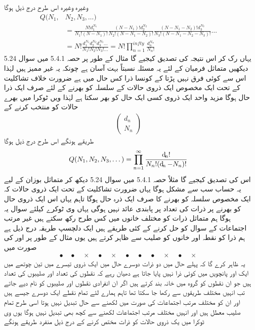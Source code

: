 وغیرہ وغیرہ اس طرح درج ذیل ہوگا 
\begin{align}
Q (N_1 , &N_2 , N_3 , \dotsc) \\
&= \frac{N ! d_1^{N_1}}{N_1 ! (N - N_1) !} \frac{(N - N_1) ! d_2^{N_2}}{N_2 ! (N - N_1 - N_2) !} \frac{(N - N_1 - N_2) ! d_3^{N_3}}{N_3 ! (N - N_1 - N_2 - N_3) !} \dotsc\\
&= N ! \frac{d_1^{N_1} d_2^{N_2} d_3^{N_3} \dotsc}{N_1 ! N_2 ! N_3 ! \dotsc} = N! \prod_{n = 1}^{infty} \frac{d_n^{N_n}}{N_n !}
\end{align}
یہاں رک کر اس نتیجہ کی تصدیق کیجیے گا مثال کے طور پر حصہ 5.4.1 میں سوال 5.24 دیکھیں متماثل فرمیان کے لئے یہ مسئلہ نسبتاً بہت آسان ہے چونکہ یہ غیر ممیز ہیں لہٰذا اس سے کوئی فرق نہیں پڑتا کے کونسا ذرا کس حال میں ہے ضرورت خلاف تشاکلیت کے تحت ایک مخصوص ایک ذروی حالات کے سلسلہ کو بھرنے کے لئے صرف ایک  ذرا حال ہوگا مزید واحد ایک ذروی کسی ایک حال کو بھر سکتا ہے لہٰذا  ویں ٹوکرا میں  بهرے  حالات کو منتخب کرنے کے 
\begin{align*}
\begin{pmatrix}
d_n \\
N_n
\end{pmatrix}
\end{align*}
طریقے ہونگے اس طرح درج ذیل ہوگا 
\begin{align}
Q (N_1 , N_2 , N_3 , \dotsc ) = \prod_{n = 1}^{\infty} \frac{\dif_n !}{N_n ! (\dif_n - N_n) !}
\end{align}
اس کی تصدیق کیجیے گا مثلاً حصہ 5.4.1 میں سوال 5.24 دیکھ کر متماثل بوزان کے لیے یہ حساب سب سے مشکل ہوگا یہاں ضرورت تشاکلیت کے تحت ایک ذروی حالات کہ ایک مخصوص سلسلہ کو بھرنے کا صرف ایک  ذرہ حال ہوگا تاہم یہاں اس ایک ذروی حال کو بھرنے پر ذرات کی تعداد پر پابندی عائد نہیں ہوگی یہاں  وی ٹوکرے کیلئے سوال یہ ہوگا ہم متماثل  ذرات کو  مختلف خانوں میں کس طرح رکھ سکتے ہیں غیر مرتب اجتماعات کے سوال کو حل کرنے کے کئی طریقے ہیں ایک دلچسپ طریقہ درج ذیل ہے ہم ذرا کو نقطہ اور خانوں کو صلیب سے ظاہر کرتے ہیں یوں مثال کے طور پر  اور  کی صورت میں
\begin{align*} 
\bullet \quad \bullet \quad \times \quad \bullet \quad \times \quad \bullet \quad \bullet \quad \bullet \quad \times \quad \bullet \quad \times
\end{align*}
یہ ظاہر کرے گا کہ پہلے حال میں دو ذرات دوسرے حال میں ایک ذروی تیسرے میں تین چوتھے میں ایک اور پانچویں میں کوئی ذرا نہیں پایا جاتا ہے دھیان رہے کہ نقطوں کی تعداد  اور صلیبوں کی تعداد  ہیں جو ان نقطوں کو  گروہ میں خانہ بند کرتے ہیں اگر ان انفرادی نقطوں اور صلیبوں کو نام دیے جاتے تب انہیں  مختلف طریقوں سے رکھا جا سکتا تھا تاہم ہمارے لئے تمام نقطے ایک دوسرے  جیسے ہیں اور ان کو  مختلف مرتب اجتماعات کی صورت میں لکھنے سے حال تبدیل نہیں ہوتا اسی طرح تمام صلیب معطل ہیں اور انہیں  مختلف مرتب اجتماعات لکھنے سے کچھ بھی تبدیل نہیں ہوگا یوں  وی ٹوکرا میں  یک ذروی حالات کو  ذرات مختص کرنے کے درج ذیل منفرد طریقے ہونگے 
